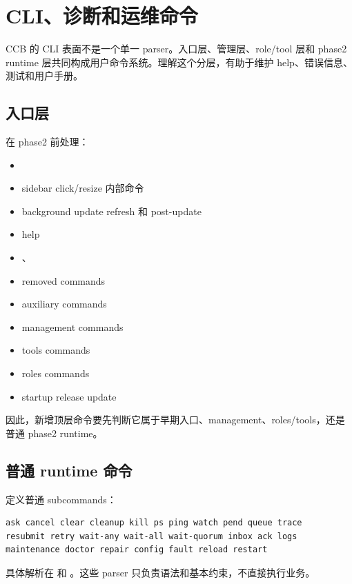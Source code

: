 \chapter{CLI、诊断和运维命令}

CCB 的 CLI 表面不是一个单一 parser。入口层、管理层、role/tool 层和 phase2 runtime 层共同构成用户命令系统。理解这个分层，有助于维护 help、错误信息、测试和用户手册。

\section{入口层}

 在 phase2 前处理：

\begin{itemize}
  \item {}
  \item sidebar click/resize 内部命令
  \item background update refresh 和 post-update
  \item help
  \item {}、
  \item removed commands
  \item auxiliary commands
  \item management commands
  \item tools commands
  \item roles commands
  \item startup release update
\end{itemize}

因此，新增顶层命令要先判断它属于早期入口、management、roles/tools，还是普通 phase2 runtime。

\section{普通 runtime 命令}

 定义普通 subcommands：

\begin{lstlisting}
ask cancel clear cleanup kill ps ping watch pend queue trace
resubmit retry wait-any wait-all wait-quorum inbox ack logs
maintenance doctor repair config fault reload restart
\end{lstlisting}

具体解析在  和 。这些 parser 只负责语法和基本约束，不直接执行业务。

